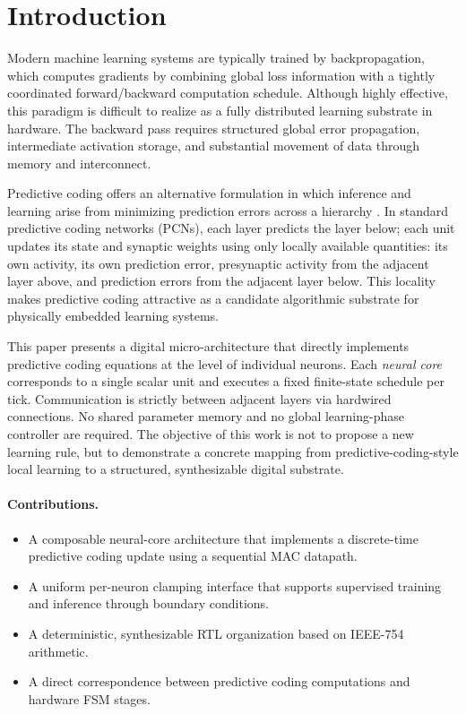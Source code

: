\documentclass{article}
\begin{document}
\section{Introduction}
\label{sec:intro}

Modern machine learning systems are typically trained by backpropagation, which computes gradients by combining global loss information with a tightly coordinated forward/backward computation schedule. Although highly effective, this paradigm is difficult to realize as a fully distributed learning substrate in hardware. The backward pass requires structured global error propagation, intermediate activation storage, and substantial movement of data through memory and interconnect.

Predictive coding offers an alternative formulation in which inference and learning arise from minimizing prediction errors across a hierarchy \cite{rao1999predictive, friston2005theory}. In standard predictive coding networks (PCNs), each layer predicts the layer below; each unit updates its state and synaptic weights using only locally available quantities: its own activity, its own prediction error, presynaptic activity from the adjacent layer above, and prediction errors from the adjacent layer below. This locality makes predictive coding attractive as a candidate algorithmic substrate for physically embedded learning systems.

This paper presents a digital micro-architecture that directly implements predictive coding equations at the level of individual neurons. Each \emph{neural core} corresponds to a single scalar unit and executes a fixed finite-state schedule per tick. Communication is strictly between adjacent layers via hardwired connections. No shared parameter memory and no global learning-phase controller are required. The objective of this work is not to propose a new learning rule, but to demonstrate a concrete mapping from predictive-coding-style local learning to a structured, synthesizable digital substrate.

\paragraph{Contributions.}
\begin{itemize}[leftmargin=*]
\item A composable neural-core architecture that implements a discrete-time predictive coding update using a sequential MAC datapath.
\item A uniform per-neuron clamping interface that supports supervised training and inference through boundary conditions.
\item A deterministic, synthesizable RTL organization based on IEEE-754 arithmetic.
\item A direct correspondence between predictive coding computations and hardware FSM stages.
\end{itemize}
\end{document}
